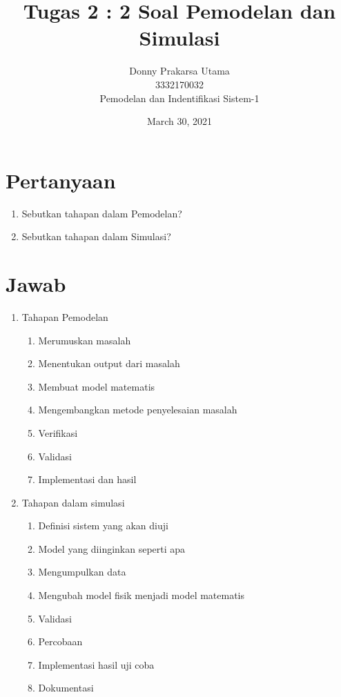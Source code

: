 \documentclass[10pt]{article}
\begin{document}
\title{Tugas 2 : 2 Soal Pemodelan dan Simulasi }
\author{Donny Prakarsa Utama\\3332170032\\Pemodelan dan Indentifikasi Sistem-1}
\date{March 30, 2021}
\maketitle

\section{Pertanyaan}
\begin{enumerate}
    \item Sebutkan tahapan dalam Pemodelan?
    \item Sebutkan tahapan dalam Simulasi?
\end{enumerate}
\section{Jawab}
\begin{enumerate}
    \item Tahapan Pemodelan\begin{enumerate}
        \item Merumuskan masalah
        \item Menentukan output dari masalah
        \item Membuat model matematis
        \item Mengembangkan metode penyelesaian masalah
        \item Verifikasi
        \item Validasi
        \item Implementasi dan hasil
    \end{enumerate}
    \item Tahapan dalam simulasi \begin{enumerate}
        \item Definisi sistem yang akan diuji
        \item Model yang diinginkan seperti apa
        \item Mengumpulkan data
        \item Mengubah model fisik menjadi model matematis
        \item Validasi
        \item Percobaan
        \item Implementasi hasil uji coba
        \item Dokumentasi
    \end{enumerate}
\end{enumerate}
\end{document}
